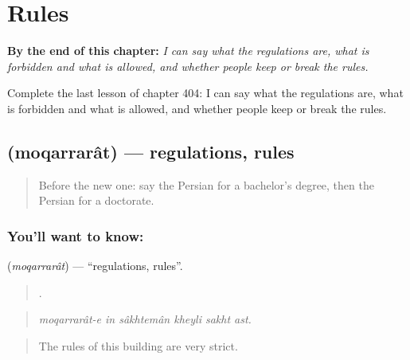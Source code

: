 
\chapter{Rules}
\label{ch:fa-rules}

\begin{chapteropening}
\textbf{By the end of this chapter:} \emph{I can say what the regulations are, what is forbidden and what is allowed, and whether people keep or break the rules.}

Complete the last lesson of chapter 404: I can say what the regulations are, what is forbidden and what is allowed, and whether people keep or break the rules.
\end{chapteropening}

\section[\texorpdfstring{\fa{مقررات} (moqarrarât)}{مقررات (moqarrarât)}]{ (moqarrarât) — regulations, rules}

\label{lesson:FA-C404-moqarrarat}



\begin{quote}
Before the new one: say the Persian for a bachelor's degree, then the Persian for a doctorate.
\end{quote}

\subsection*{You'll want to know: }
\textbf{} (\emph{moqarrarât}) — \textquotedblleft{}regulations, rules\textquotedblright{}.

\begin{quote}
     .
\end{quote}

\begin{quote}
\emph{moqarrarât-e in sâkhtemân kheyli sakht ast.}
\end{quote}

\begin{quote}
The rules of this building are very strict.
\end{quote}

